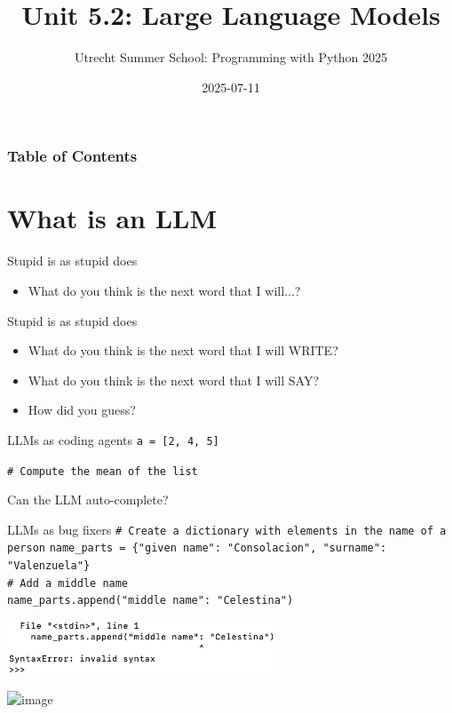 \documentclass[t,xcolor={dvipsnames},final,aspectratio=169]{beamer}
\title{Unit 5.2:
Large Language Models}
\author{Utrecht Summer School: 
Programming with Python 2025}
\institute[UU]{
}
\date{2025-07-11}
\begin{document}
\begin{frame}
\maketitle
\end{frame}

{
\begin{frame}
\frametitle{Table of Contents}
\tableofcontents
\end{frame}
}

\section{What is an LLM}
\begin{frame}{Stupid is as stupid does}
\begin{itemize}
\item What do you think is the next word that I will...?
\end{itemize}
\end{frame}
\begin{frame}{Stupid is as stupid does}
\begin{itemize}
\item What do you think is the next word that I will WRITE?
\item What do you think is the next word that I will SAY?
\item How did you guess?
\end{itemize}
\end{frame}

\begin{frame}{LLMs as coding agents}
\texttt{a = [2, 4, 5]}
\pause

\texttt{\# Compute the mean of the list}
\pause

Can the LLM auto-complete?
\end{frame}

{
\begin{frame}{LLMs as bug fixers}
\texttt{\# Create a dictionary with elements in the name of a person}
\texttt{name\_parts = \{"given name": "Consolacion", "surname": "Valenzuela"\}} \\
\texttt{\# Add a middle name}\\
\texttt{name\_parts.append("middle name": "Celestina")}

\pause
\vfill
\includegraphics[width=8cm]{error.png}

\pause
\vfill
\includegraphics<+->[width=8cm]{llm.png}
\end{frame}
}
\end{document}
